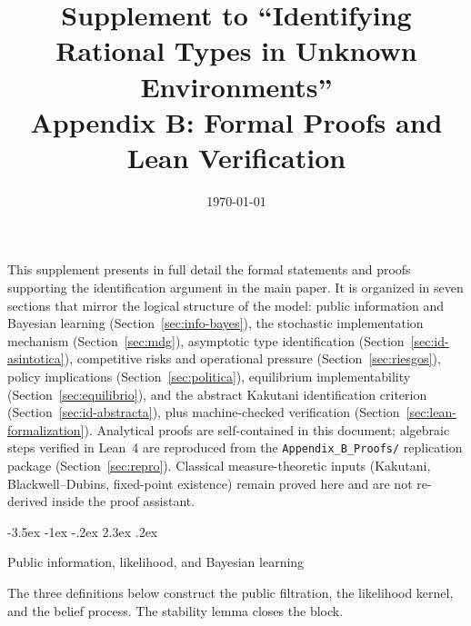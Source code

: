 \documentclass[12pt]{article}
\makeatletter
\numberwithin{equation}{section}
\numberwithin{table}{section}
\theoremstyle{definition}
\renewcommand\section{\@startsection {section}{1}{\z@}%
                                   {-3.5ex \@plus -1ex \@minus -.2ex}%
                                   {2.3ex \@plus.2ex}%
                                   {\normalfont\Large\bfseries\raggedright}}
\makeatother
\begin{document}
\title{Supplement to ``Identifying Rational Types in Unknown Environments''\\
Appendix B: Formal Proofs and Lean Verification}
\author{}
\date{\today}
\maketitle

\noindent
This supplement presents in full detail the formal statements and proofs
supporting the identification argument in the main paper. It is organized in
seven sections that mirror the logical structure of the model: public information and Bayesian learning
(Section~\ref{sec:info-bayes}), the stochastic implementation mechanism
(Section~\ref{sec:mdg}), asymptotic type identification
(Section~\ref{sec:id-asintotica}), competitive risks and operational pressure
(Section~\ref{sec:riesgos}), policy implications (Section~\ref{sec:politica}),
equilibrium implementability (Section~\ref{sec:equilibrio}), and the abstract
Kakutani identification criterion (Section~\ref{sec:id-abstracta}), plus
machine-checked verification (Section~\ref{sec:lean-formalization}). Analytical
proofs are self-contained in this document; algebraic steps verified in Lean~4
are reproduced from the \texttt{Appendix\_B\_Proofs/} replication package
(Section~\ref{sec:repro}). Classical measure-theoretic inputs (Kakutani,
Blackwell--Dubins, fixed-point existence) remain proved here and are not
re-derived inside the proof assistant.

\section{Public information, likelihood, and Bayesian learning}
\label{sec:info-bayes}

\noindent The three definitions below construct the public filtration, the
likelihood kernel, and the belief process. The stability lemma closes the
block.

\end{document}

